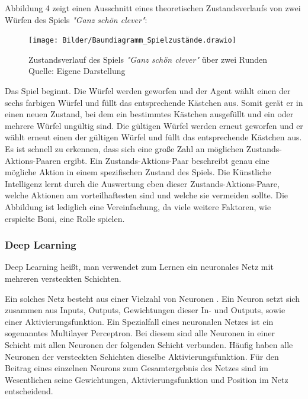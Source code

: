 Abbildung 4 zeigt einen Ausschnitt eines theoretischen Zustandsverlaufs von zwei Würfen des Spiels \textit{"Ganz schön clever"}:
\nopagebreak
\begin{figure}[H]
	\texttt{[image: Bilder/Baumdiagramm\_Spielzustände.drawio]} 
	\caption[Zustandsverlauf des Spiels \textit{"Ganz schön clever"} über zwei Runden]{Zustandsverlauf des Spiels \textit{"Ganz schön clever"} über zwei Runden\\ Quelle: Eigene Darstellung}
\end{figure}	

Das Spiel beginnt. Die Würfel werden geworfen und der Agent wählt einen der sechs farbigen Würfel und füllt das entsprechende Kästchen aus. Somit gerät er in einen neuen Zustand, bei dem ein bestimmtes Kästchen ausgefüllt und ein oder mehrere Würfel ungültig sind. Die gültigen Würfel werden erneut geworfen und er wählt erneut einen der gültigen Würfel und füllt das entsprechende Kästchen aus. Es ist schnell zu erkennen, dass sich eine große Zahl an möglichen Zustands-Aktions-Paaren ergibt. Ein Zustands-Aktions-Paar beschreibt genau eine mögliche Aktion in einem spezifischen Zustand des Spiels. Die Künstliche Intelligenz lernt durch die Auswertung eben dieser Zustands-Aktions-Paare, welche Aktionen am vorteilhaftesten sind und welche sie vermeiden sollte. Die Abbildung ist lediglich eine Vereinfachung, da viele weitere Faktoren, wie erspielte Boni, eine Rolle spielen.
\subsubsection{Deep Learning}
Deep Learning heißt, man verwendet zum Lernen ein neuronales Netz mit mehreren versteckten Schichten. 

Ein solches Netz besteht aus einer Vielzahl von Neuronen \cite[S. 75]{sewak_deep_2019}. Ein Neuron setzt sich zusammen aus Inputs, Outputs, Gewichtungen dieser In- und Outputs, sowie einer Aktivierungsfunktion. Ein Spezialfall eines neuronalen Netzes ist ein sogenanntes Multilayer Perceptron. Bei diesem sind alle Neuronen in einer Schicht mit allen Neuronen der folgenden Schicht verbunden. Häufig haben alle Neuronen der versteckten Schichten dieselbe Aktivierungsfunktion. Für den Beitrag eines einzelnen Neurons zum Gesamtergebnis des Netzes sind im Wesentlichen seine Gewichtungen, Aktivierungsfunktion und Position im Netz entscheidend.\\

